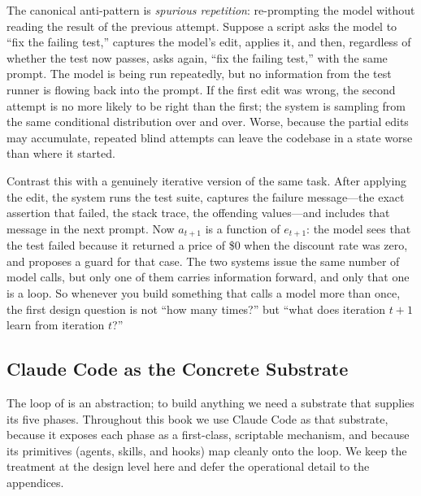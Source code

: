 The canonical anti-pattern is \emph{spurious repetition}: re-prompting the model without reading the result of the previous attempt. Suppose a script asks the model to ``fix the failing test,'' captures the model's edit, applies it, and then, regardless of whether the test now passes, asks again, ``fix the failing test,'' with the same prompt. The model is being run repeatedly, but no information from the test runner is flowing back into the prompt. If the first edit was wrong, the second attempt is no more likely to be right than the first; the system is sampling from the same conditional distribution over and over. Worse, because the partial edits may accumulate, repeated blind attempts can leave the codebase in a state worse than where it started.

Contrast this with a genuinely iterative version of the same task. After applying the edit, the system runs the test suite, captures the failure message---the exact assertion that failed, the stack trace, the offending values---and includes that message in the next prompt. Now $a_{t+1}$ is a function of $e_{t+1}$: the model sees that the test failed because it returned a price of \$0 when the discount rate was zero, and proposes a guard for that case. The two systems issue the same number of model calls, but only one of them carries information forward, and only that one is a loop. So whenever you build something that calls a model more than once, the first design question is not ``how many times?'' but ``what does iteration $t+1$ learn from iteration $t$?''

\subsection{Claude Code as the Concrete Substrate}\label{subsec:claude-code-substrate}

The loop of  is an abstraction; to build anything we need a substrate that supplies its five phases. Throughout this book we use Claude Code as that substrate, because it exposes each phase as a first-class, scriptable mechanism, and because its primitives (agents, skills, and hooks) map cleanly onto the loop. We keep the treatment at the design level here and defer the operational detail to the appendices.

